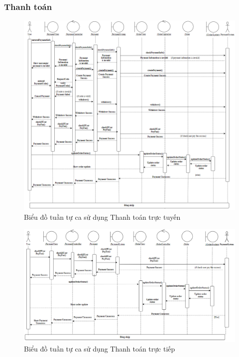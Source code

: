 \subsubsection{Thanh toán}
\begin{figure}[H]
    \centering
    \includegraphics[width=\textwidth]{img2/2.1thanhtoanbangtk.png}
    \caption{Biểu đồ tuần tự ca sử dụng Thanh toán trực tuyến}
\end{figure}

\begin{figure}[H]
    \centering
    \includegraphics[width=\textwidth]{img2/2.1thanhtoantructiep.png}
    \caption{Biểu đồ tuần tự ca sử dụng Thanh toán trực tiếp}
\end{figure}

